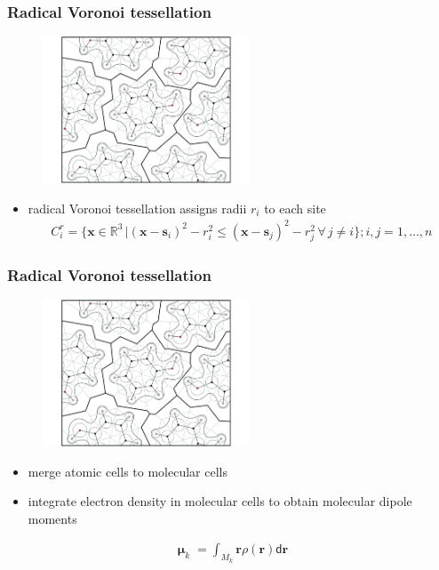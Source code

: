 \documentclass[t]{beamer}
\begin{document}
\begin{frame}
	\frametitle{Radical Voronoi tessellation}
	\begin{figure}
		\includegraphics[width=0.55\textwidth]{figures/MT_voronoi.pdf}
	\end{figure}
	\begin{itemize}
		\item radical Voronoi tessellation assigns radii $r_i$ to each site
		      \begin{align*}
			      C_i^r = \{ \mathbf{x} \in \mathbb{R}^3 \, | ( \mathbf{x} - \mathbf{s}_i )^2 - r_i^2 \leq ( \mathbf{x} - \mathbf{s}_j )^2 - r_j^2 \, \forall \, j \neq i \}; i,j=1,...,n
		      \end{align*}
	\end{itemize}
\end{frame}
\begin{frame}
	\frametitle{Radical Voronoi tessellation}
	\begin{figure}
		\includegraphics[width=0.55\textwidth]{figures/MT_voronoi.pdf}
	\end{figure}
	\begin{itemize}
		\item merge atomic cells to molecular cells
		\item integrate electron density in molecular cells to obtain molecular dipole moments
	\end{itemize}
	\begin{align*}
		\boldsymbol\upmu_k = \int_{M_k} \mathbf{r} \rho(\mathbf{r}) \mathsf{d}\mathbf{r}
	\end{align*}
\end{frame}
\end{document}
